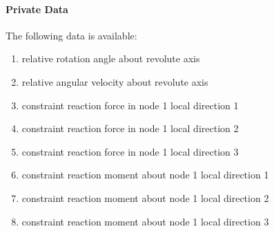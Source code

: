 \paragraph{Private Data}
The following data is available:
\begin{enumerate}
\item {} relative rotation angle about revolute axis
\item {} relative angular velocity about revolute axis
\item {} constraint reaction force in node 1 local direction 1
\item {} constraint reaction force in node 1 local direction 2
\item {} constraint reaction force in node 1 local direction 3
\item {} constraint reaction moment about node 1 local direction 1
\item {} constraint reaction moment about node 1 local direction 2
\item {} constraint reaction moment about node 1 local direction 3
\end{enumerate}





